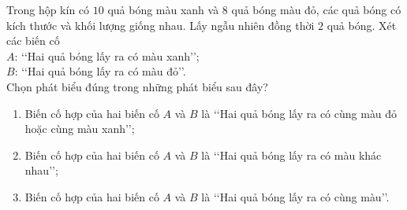\begin{vd}[Mức 2]%
	Trong hộp kín có $10$ quả bóng màu xanh và $8$ quả bóng màu đỏ, các quả bóng có kích thước và khối lượng giống nhau. Lấy ngẫu nhiên đồng thời $2$ quả bóng. Xét các biến cố\\
	$A$: \lq\lq Hai quả bóng lấy ra có màu xanh\rq\rq;\\
	$B$: \lq\lq Hai quả bóng lấy ra có màu đỏ\rq\rq.\\
	Chọn phát biểu đúng trong những phát biểu sau đây?
	\begin{enumerate}
		\item Biến cố hợp của hai biến cố $A$ và $B$ là \lq\lq Hai quả bóng lấy ra có cùng màu đỏ hoặc cùng màu xanh\rq\rq;
		\item Biến cố hợp của hai biến cố $A$ và $B$ là \lq\lq Hai quả bóng lấy ra có màu khác nhau\rq\rq;
		\item Biến cố hợp của hai biến cố $A$ và $B$ là \lq\lq Hai quả bóng lấy ra có cùng màu\rq\rq.
	\end{enumerate}
\end{vd}


